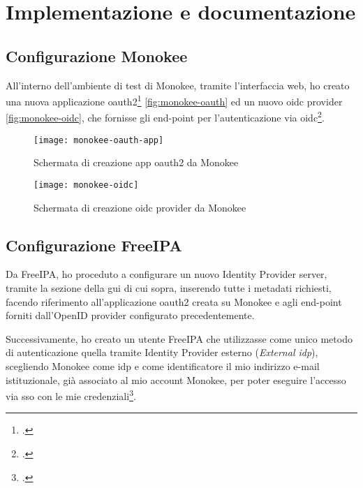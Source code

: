 
\chapter{Implementazione e documentazione}
\label{cap:implementazione-documentazione}



\section{Configurazione Monokee}
All'interno dell'ambiente di test di Monokee, tramite l'interfaccia web, ho creato una nuova applicazione \acrshort{oauth2}\footcite{site:oauth-flow} \autoref{fig:monokee-oauth} ed un nuovo \acrshort{oidc} provider \autoref{fig:monokee-oidc}, che fornisse gli end-point per l'autenticazione via \acrshort{oidc}\footcite{site:monokee-docs}.


\begin{figure}[!h] 
    \centering 
    \texttt{[image: monokee-oauth-app]} 
    \caption{Schermata di creazione app \acrshort{oauth2} da Monokee}
    \label{fig:monokee-oauth}
\end{figure}

\begin{figure}[!h] 
    \centering 
    \texttt{[image: monokee-oidc]} 
    \caption{Schermata di creazione \acrshort{oidc} provider da Monokee}
    \label{fig:monokee-oidc}
\end{figure}

\section{Configurazione FreeIPA}
Da FreeIPA, ho proceduto a configurare un nuovo Identity Provider server, tramite la sezione della \acrfull{gui} di cui sopra, inserendo tutte i metadati richiesti, facendo riferimento all'applicazione \acrshort{oauth2} creata su Monokee e agli end-point forniti dall'OpenID provider configurato precedentemente.

Successivamente, ho creato un utente FreeIPA che utilizzasse come unico metodo di autenticazione quella tramite Identity Provider esterno (\emph{External \acrshort{idp}}), scegliendo Monokee come \acrshort{idp} e come identificatore il mio indirizzo e-mail istituzionale, già associato al mio account Monokee, per poter eseguire l'accesso via \acrshort{sso} con le mie credenziali\footcite{site:using-ext-idp-idm}.  

